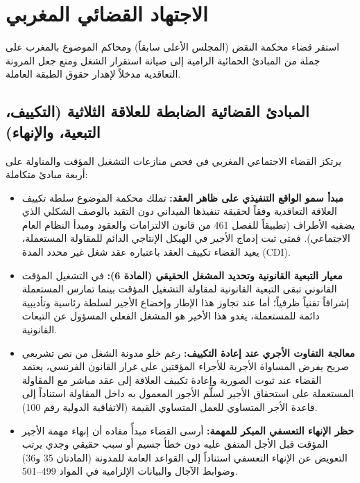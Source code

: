 \section{الاجتهاد القضائي المغربي}

استقر قضاء محكمة النقض (المجلس الأعلى سابقاً) ومحاكم الموضوع بالمغرب على جملة من المبادئ الحمائية الرامية إلى صيانة استقرار الشغل ومنع جعل المرونة التعاقدية مدخلاً لإهدار حقوق الطبقة العاملة.

\subsection{المبادئ القضائية الضابطة للعلاقة الثلاثية (التكييف، التبعية، والإنهاء)}
يرتكز القضاء الاجتماعي المغربي في فحص منازعات التشغيل المؤقت والمناولة على أربعة مبادئ متكاملة:
\begin{itemize}[leftmargin=*, itemsep=5pt]
    \item \textbf{مبدأ سمو الواقع التنفيذي على ظاهر العقد:} تملك محكمة الموضوع سلطة تكييف العلاقة التعاقدية وفقاً لحقيقة تنفيذها الميداني دون التقيد بالوصف الشكلي الذي يضفيه الأطراف (تطبيقاً للفصل \textenglish{461} من قانون الالتزامات والعقود ومبدأ النظام العام الاجتماعي). فمتى ثبت إدماج الأجير في الهيكل الإنتاجي الدائم للمقاولة المستعملة، يعيد القضاء تكييف العقد باعتباره عقد شغل غير محدد المدة (\textenglish{CDI}).
    \item \textbf{معيار التبعية القانونية وتحديد المشغل الحقيقي (المادة \textenglish{6}):} في التشغيل المؤقت القانوني تبقى التبعية القانونية لمقاولة التشغيل المؤقت بينما تمارس المستعملة إشرافاً تقنياً ظرفياً؛ أما عند تجاوز هذا الإطار وإخضاع الأجير لسلطة رئاسية وتأديبية دائمة للمستعملة، يغدو هذا الأخير هو المشغل الفعلي المسؤول عن التبعات القانونية.
    \item \textbf{معالجة التفاوت الأجري عند إعادة التكييف:} رغم خلو مدونة الشغل من نص تشريعي صريح يفرض المساواة الأجرية للأجراء المؤقتين على غرار القانون الفرنسي، يعتمد القضاء عند ثبوت الصورية وإعادة تكييف العلاقة إلى عقد مباشر مع المقاولة المستعملة على استحقاق الأجير لسلّم الأجور المعمول به داخل المقاولة استناداً إلى قاعدة الأجر المتساوي للعمل المتساوي القيمة (الاتفاقية الدولية رقم \textenglish{100}).
    \item \textbf{حظر الإنهاء التعسفي المبكر للمهمة:} أرسى القضاء مبدأً مفاده أن إنهاء مهمة الأجير المؤقت قبل الأجل المتفق عليه دون خطأ جسيم أو سبب حقيقي وجدي يرتب التعويض عن الإنهاء التعسفي استناداً إلى القواعد العامة للمدونة (المادتان \textenglish{35} و\textenglish{36}) وضوابط الآجال والبيانات الإلزامية في المواد \textenglish{499}--\textenglish{501}.
\end{itemize}

